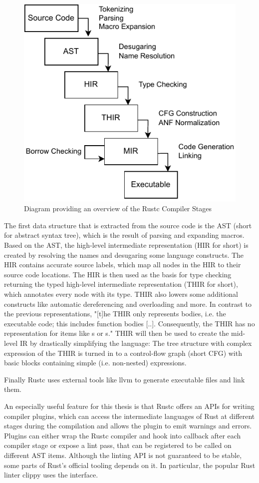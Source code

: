\documentclass[twoside, english, final]{sdqthesis}
\theoremstyle{definition}
\begin{document}
\begin{figure}[h]
	\centering
	\includegraphics[width=0.6\linewidth]{./rustc-stages.pdf}
	\caption{Diagram providing an overview of the Rustc Compiler Stages}
	\label{fig:rust-stages}
\end{figure}

The first data structure that is extracted from the source code is the AST (short for abstract syntax tree), which is the result of parsing and expanding macros. 
Based on the AST, the high-level intermediate representation (HIR for short) is created by resolving the names and desugaring some language constructs. The HIR contains accurate source labels, which map all nodes in the HIR to their source code locations. 
The HIR is then used as the basis for type checking returning the typed high-level intermediate representation (THIR for short), which annotates every node with its type. THIR also lowers some additional constructs like automatic dereferencing and overloading and more. In contrast to the previous representations, "[t]he THIR only represents bodies, i.e. the executable code; this includes function bodies [..]. Consequently, the THIR has no representation for items like s or s." \cite[p. 1]{noauthor_thir_nodate}
THIR will then be used to create the mid-level IR by drastically simplifying the language: The tree structure with complex expression of the THIR is turned in to a control-flow graph (short CFG) with basic blocks containing simple (i.e. non-nested) expressions.

Finally Rustc uses external tools \- like llvm \- to generate executable files and link them.

An especially useful feature for this thesis is that Rustc offers an APIs for writing compiler plugins, which can access the intermediate languages of Rust at different stages during the compilation and allows the plugin to emit warnings and errors. 
Plugins can either wrap the Rustc compiler and hook into callback after each compiler stage or expose a lint pass, that can be registered to be called on different AST items.
Although the linting API is not guaranteed to be stable, some parts of Rust's official tooling depends on it. In particular, the popular Rust linter clippy uses the interface.
\end{document}
